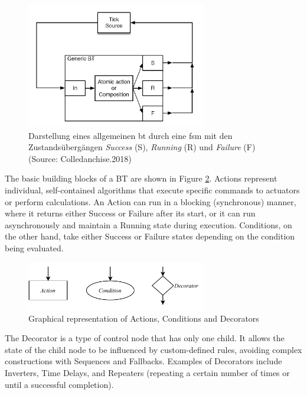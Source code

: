\begin{figure}[h]
    \centering
    \includegraphics[width=0.7\textwidth]{figures/02_state_of_the_art/fsm_general_bt.png}
    \caption[Allgemeiner \textit{Behavior Tree} als FSM]{Darstellung eines allgemeinen \gls{bt} durch eine \gls{fsm} mit den Zustandsübergängen \textit{Success} (S), \textit{Running} (R) und \textit{Failure} (F) (Source: Colledanchise.2018)}
    \label{fig:fsm_general_bt}
                          \end{figure}

The basic building blocks of a BT are shown in Figure \ref{fig:bt_types}. Actions represent individual, self-contained algorithms that execute specific commands to actuators or perform calculations. An Action can run in a blocking (synchronous) manner, where it returns either Success or Failure after its start, or it can run asynchronously and maintain a Running state during execution. Conditions, on the other hand, take either Success or Failure states depending on the condition being evaluated.

\begin{figure}[h]
    \centering
    \includegraphics[width=0.7\textwidth]{figures/02_state_of_the_art/bt_types.pdf}
    \caption{Graphical representation of Actions, Conditions and Decorators}
    \label{fig:bt_types}
\end{figure}

The Decorator is a type of control node that has only one child. It allows the state of the child node to be influenced by custom-defined rules, avoiding complex constructions with Sequences and Fallbacks. Examples of Decorators include Inverters, Time Delays, and Repeaters (repeating a certain number of times or until a successful completion).

